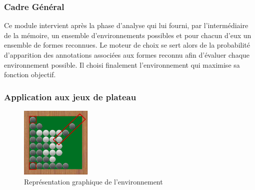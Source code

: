 

\subsubsection{Cadre Général}


Ce module intervient après la phase d'analyse qui lui fourni, par l'intermédiaire de la mémoire, un ensemble d'environnements possibles et pour chacun d'eux un ensemble de formes reconnues. Le \og moteur de choix \fg{} se sert alors de la probabilité d'apparition des annotations associées aux formes reconnu afin d'évaluer chaque environnement possible. Il choisi finalement l'environnement qui maximise sa fonction objectif.

\subsubsection{Application aux jeux de plateau}


\begin{figure}[H] 
  \begin{center}
		\includegraphics[width=0.3\textwidth]{files/raisonneur/moteur_de_choix} 
	\end{center}
\caption{Représentation graphique de l'environnement} 
\label{img_env}
\end{figure}
